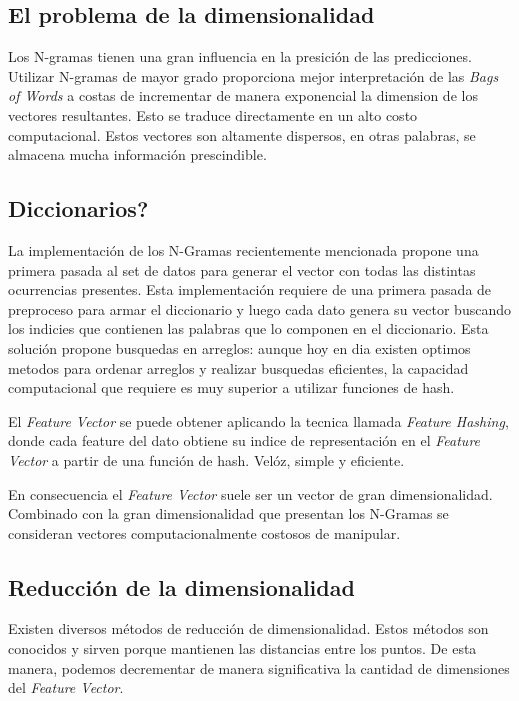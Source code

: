 \documentclass[a4paper,10pt]{article}
\begin{document}
	\subsection{El problema de la dimensionalidad}
	Los N-gramas tienen una gran influencia en la presición de las predicciones. Utilizar N-gramas de mayor grado proporciona mejor interpretación de las \textit{Bags of Words} a costas de incrementar de manera exponencial la dimension de los vectores resultantes. Esto se traduce directamente en un alto costo computacional. Estos vectores son altamente dispersos, en otras palabras, se almacena mucha información prescindible.
	
	\subsection{Diccionarios?}
	La implementación de los N-Gramas recientemente mencionada propone una primera pasada al set de datos para generar el vector con todas las distintas ocurrencias presentes. Esta implementación requiere de una primera pasada de preproceso para armar el diccionario y luego cada dato genera su vector buscando los indicies que contienen las palabras que lo componen en el diccionario. Esta solución propone busquedas en arreglos: aunque hoy en dia existen optimos metodos para ordenar arreglos y realizar busquedas eficientes, la capacidad computacional que requiere es muy superior a utilizar funciones de hash.
	
	El \textit{Feature Vector} se puede obtener aplicando la tecnica llamada \textit{Feature Hashing}, donde cada feature del dato obtiene su indice de representación en el \textit{Feature Vector} a partir de una función de hash. Velóz, simple y eficiente.
	
	En consecuencia el \textit{Feature Vector} suele ser un vector de gran dimensionalidad. Combinado con la gran dimensionalidad que presentan los N-Gramas se consideran vectores computacionalmente costosos de manipular.
	
	\subsection{Reducción de la dimensionalidad}
	
	Existen diversos métodos de reducción de dimensionalidad. Estos métodos son conocidos y sirven porque mantienen las distancias entre los puntos. De esta manera, podemos decrementar de manera significativa la cantidad de dimensiones del \textit{Feature Vector}.
	
\end{document}
